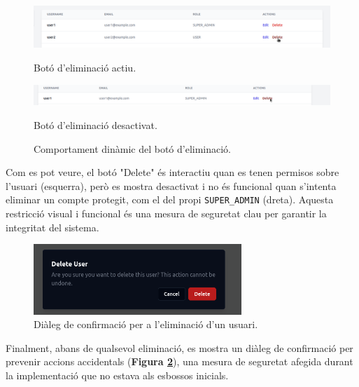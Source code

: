 \begin{figure}[H]
    \centering
    \begin{minipage}{0.48\textwidth}
        \centering
        \includegraphics[width=\linewidth]{Figures/ui-web/delete_user_valid.png}
        \caption{Botó d'eliminació actiu.}
        \label{fig:react-delete-valid-impl}
    \end{minipage}\hfill
    \begin{minipage}{0.48\textwidth}
        \centering
        \includegraphics[width=\linewidth]{Figures/ui-web/super_user_not_delete.png}
        \caption{Botó d'eliminació desactivat.}
        \label{fig:react-delete-invalid-impl}
    \end{minipage}
    \caption{Comportament dinàmic del botó d'eliminació.}
\end{figure}
Com es pot veure, el botó "Delete" és interactiu quan es tenen permisos sobre l'usuari (esquerra), però es mostra desactivat i no és funcional quan s'intenta eliminar un compte protegit, com el del propi \texttt{SUPER\_ADMIN} (dreta). Aquesta restricció visual i funcional és una mesura de seguretat clau per garantir la integritat del sistema.

\begin{figure}[H]
    \centering
    \includegraphics[width=0.7\textwidth]{Figures/ui-web/delete_user_admin_confirm.png}
    \caption{Diàleg de confirmació per a l'eliminació d'un usuari.}
    \label{fig:react-delete-confirm-impl}
\end{figure}
Finalment, abans de qualsevol eliminació, es mostra un diàleg de confirmació per prevenir accions accidentals (\textbf{Figura \ref{fig:react-delete-confirm-impl}}), una mesura de seguretat afegida durant la implementació que no estava als esbossos inicials.

